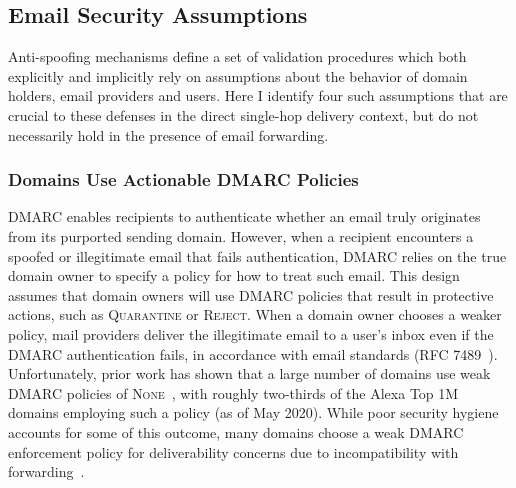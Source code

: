 \subsection{Email Security Assumptions}
\label{subsec:assumptions}
Anti-spoofing mechanisms define a set of validation procedures which
both explicitly and implicitly rely on assumptions about the behavior
of domain holders, email providers and users.  Here I identify four
such assumptions that are crucial to these defenses in the direct
single-hop delivery context, but do not necessarily hold in the
presence of email forwarding.




\subsubsection{Domains Use Actionable DMARC Policies}
\label{subsubsec:dmarc_none}
DMARC enables recipients to authenticate whether an email truly
originates from its purported sending domain.  However, when a
recipient encounters a spoofed or illegitimate email that fails
authentication, DMARC relies on the true domain owner to specify a
policy for how to treat such email.  This design assumes that domain
owners will use DMARC policies that result in protective
actions, such as \textsc{Quarantine} or \textsc{Reject}.  When a
domain owner chooses a weaker policy, mail providers deliver the
illegitimate email to a user's inbox even if the DMARC authentication
fails, in accordance with email standards (RFC 7489~\cite{rfc7489}).
Unfortunately, prior work has shown that a large number of domains use
weak DMARC policies of
\textsc{None}~\cite{hu_end--end_nodate,tatang2021evolution,hutowardsunderstanding,
  secplaintxt, maroofi2020defensive, adoptionofschemes}, with roughly
two-thirds of the Alexa Top 1M domains employing such a policy (as of
May 2020).  While poor security hygiene accounts for some of this
outcome, many domains choose a weak DMARC enforcement policy for
deliverability concerns due to incompatibility with forwarding~\cite{hutowardsunderstanding}.

